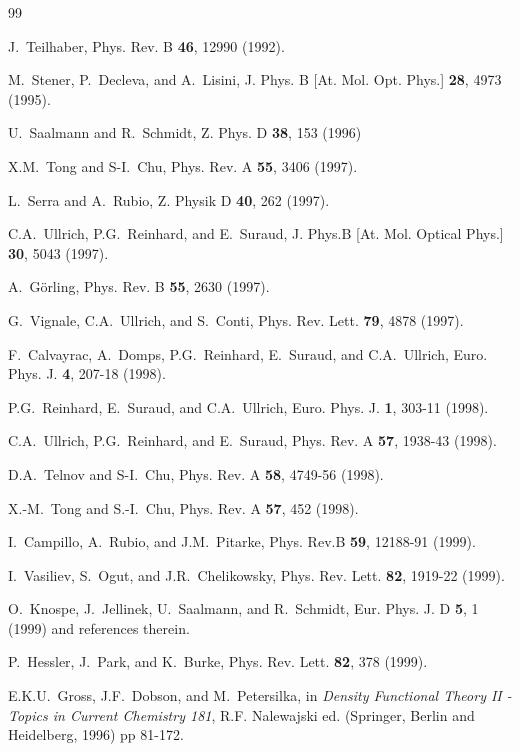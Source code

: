 \documentclass[aps,preprint]{revtex4}%
\begin{document}
\begin{thebibliography}{99}                                                                                               %


J.~Teilhaber, Phys. Rev. B \textbf{46}, 12990 (1992).

M.~Stener, P.~Decleva, and A.~Lisini, J. Phys. B [At. Mol.
Opt. Phys.] \textbf{28}, 4973 (1995).

U.~Saalmann and R.~Schmidt, Z. Phys. D \textbf{38}, 153 (1996)

X.M.~Tong and S-I.~Chu, Phys. Rev. A \textbf{55}, 3406 (1997).

L.~Serra and A.~Rubio, Z. Physik D \textbf{40}, 262 (1997).

C.A.~Ullrich, P.G.~Reinhard, and E.~Suraud, J. Phys.B [At.
Mol. Optical Phys.] \textbf{30}, 5043 (1997).

A.~G\"orling, Phys. Rev. B \textbf{55}, 2630 (1997).

G.~Vignale, C.A.~Ullrich, and S.~Conti, Phys. Rev. Lett.
\textbf{79}, 4878 (1997).

F.~Calvayrac, A.~Domps, P.G.~Reinhard, E.~Suraud, and
C.A.~Ullrich, Euro. Phys. J. \textbf{4}, 207-18 (1998).

P.G.~Reinhard, E.~Suraud, and C.A.~Ullrich, Euro. Phys.
J. \textbf{1}, 303-11 (1998).

C.A.~Ullrich, P.G.~Reinhard, and E.~Suraud, Phys. Rev. A
\textbf{57}, 1938-43 (1998).

D.A.~Telnov and S-I.~Chu, Phys. Rev. A \textbf{58}, 4749-56 (1998).

X.-M.~Tong and S.-I.~Chu, Phys. Rev. A \textbf{57}, 452 (1998).

I.~Campillo, A.~Rubio, and J.M.~Pitarke, Phys. Rev.B
\textbf{59}, 12188-91 (1999).

I.~Vasiliev, S.~Ogut, and J.R.~Chelikowsky, Phys. Rev.
Lett. \textbf{82}, 1919-22 (1999).

O.~Knospe, J.~Jellinek, U.~Saalmann, and R.~Schmidt, Eur.
Phys. J. D \textbf{5}, 1 (1999) and references therein.

P.~Hessler, J.~Park, and K.~Burke, Phys. Rev. Lett.
\textbf{82}, 378 (1999).

E.K.U.~Gross, J.F.~Dobson, and M.~Petersilka, in
\textit{Density Functional Theory II - Topics in Current Chemistry 181}, R.F.
Nalewajski ed. (Springer, Berlin and Heidelberg, 1996) pp 81-172.


\end{thebibliography}
\end{document}
